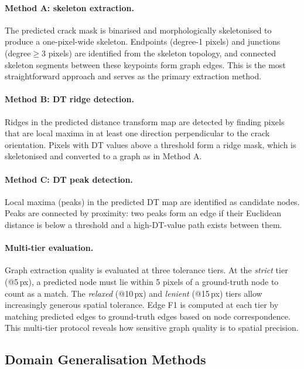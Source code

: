 \documentclass[preprint,12pt]{elsarticle}
\begin{document}
\paragraph{Method A: skeleton extraction.}
The predicted crack mask is binarised and morphologically skeletonised to produce a one-pixel-wide skeleton. Endpoints (degree-1 pixels) and junctions (degree$\geq$3 pixels) are identified from the skeleton topology, and connected skeleton segments between these keypoints form graph edges. This is the most straightforward approach and serves as the primary extraction method.

\paragraph{Method B: DT ridge detection.}
Ridges in the predicted distance transform map are detected by finding pixels that are local maxima in at least one direction perpendicular to the crack orientation. Pixels with DT values above a threshold form a ridge mask, which is skeletonised and converted to a graph as in Method A.

\paragraph{Method C: DT peak detection.}
Local maxima (peaks) in the predicted DT map are identified as candidate nodes. Peaks are connected by proximity: two peaks form an edge if their Euclidean distance is below a threshold and a high-DT-value path exists between them.

\paragraph{Multi-tier evaluation.}
Graph extraction quality is evaluated at three tolerance tiers. At the \emph{strict} tier (@5\,px), a predicted node must lie within 5 pixels of a ground-truth node to count as a match. The \emph{relaxed} (@10\,px) and \emph{lenient} (@15\,px) tiers allow increasingly generous spatial tolerance. Edge F1 is computed at each tier by matching predicted edges to ground-truth edges based on node correspondence. This multi-tier protocol reveals how sensitive graph quality is to spatial precision.

\subsection{Domain Generalisation Methods}
\label{sec:dg_methods}
\end{document}
